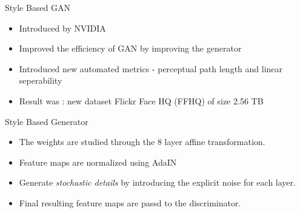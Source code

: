 
\begin{frame}[fragile]{Style Based GAN}
        \begin{itemize}
        \item Introduced by NVIDIA 
        \item Improved the efficiency of GAN by improving the generator
        \item Introduced new automated metrics - perceptual path length and linear seperability
        \item Result was  : new dataset Flickr Face HQ (FFHQ) of size 2.56 TB
    \end{itemize}

\end{frame}

\begin{frame}[fragile]{Style Based Generator}
        \begin{itemize}
        \item The weights are studied through the 8 layer affine transformation.
        \item Feature maps are normalized using AdaIN
        \item Generate \textit{stochastic details} by introducing the explicit noise for each layer.
        \item Final resulting feature maps are passd to the discriminator.
    \end{itemize}

\end{frame}

